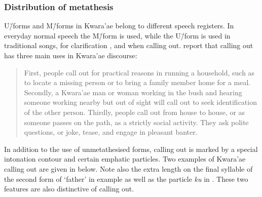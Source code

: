 \subsubsection{Distribution of metathesis}\label{sec:KwaFun}
U\=/forms and M\=/forms in Kwara'ae belong to different speech registers.
In everyday normal speech the M\=/form is used,
while the U\=/form is used in traditional songs,
for clarification \citep[3]{he04}, and when calling out.
\citet[19]{wage86} report that calling out has three main uses in Kwara'ae discourse:

\begin{quote}
First, people call out for practical reasons in running a household,
such as to locate a missing person or to bring a family member home for a meal.
Secondly, a Kwara'ae man or woman working in the bush and hearing someone
working nearby but out of sight will call out to seek identification of the other person.
Thirdly, people call out from house to house, or as someone passes on the path, as a strictly social activity.
They ask polite questions, or joke, tease, and engage in pleasant banter. \hfill\citep{wage86}
\end{quote}

In addition to the use of unmetathesised forms, calling out is marked
by a special intonation contour and certain emphatic particles.
Two examples of Kwara'ae calling out are given in  below.
Note also the extra length on the final syllable of the second form of `father' in example
 as well as the particle \emph{ku} in .
These two features are also distinctive of calling out.

\begin{exe}\let\eachwordone=\itshape
	\label{KwCallingOut}
		\begin{xlist}
		\end{xlist}
\end{exe}

